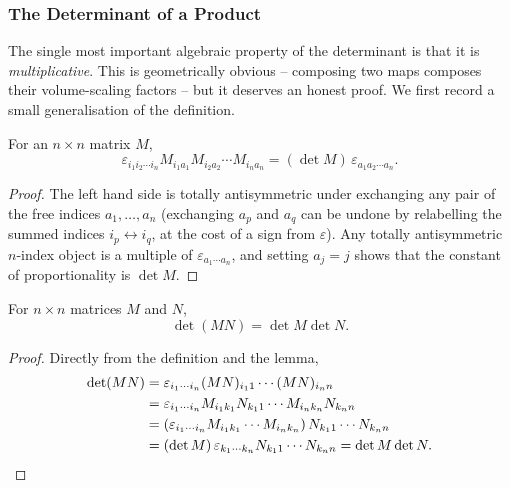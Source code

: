 \subsubsection{The Determinant of a Product}

The single most important algebraic property of the determinant is that it is \emph{multiplicative}. This is geometrically obvious -- composing two maps composes their volume-scaling factors -- but it deserves an honest proof. We first record a small generalisation of the definition.

\begin{lemma}\label{lemma:epsdet}
	For an $n \times n$ matrix $M$,
	$$
	\varepsilon_{i_1 i_2 \cdots i_n}M_{i_1 a_1}M_{i_2 a_2} \cdots M_{i_n a_n} = (\det M) \, \varepsilon_{a_1 a_2 \cdots a_n}.
	$$
\end{lemma}
\begin{proof}
	The left hand side is totally antisymmetric under exchanging any pair of the free indices $a_1, \dots, a_n$ (exchanging $a_p$ and $a_q$ can be undone by relabelling the summed indices $i_p \leftrightarrow i_q$, at the cost of a sign from $\varepsilon$). Any totally antisymmetric $n$-index object is a multiple of $\varepsilon_{a_1 \cdots a_n}$, and setting $a_j = j$ shows that the constant of proportionality is $\det M$.
\end{proof}

\begin{theorem}
	For $n \times n$ matrices $M$ and $N$,
	$$
	\det (MN) = \det M \det N.
	$$
\end{theorem}
\begin{proof}
	Directly from the definition and the lemma,
	\begin{align*}
		\det(MN) &= \varepsilon_{i_1 \cdots i_n}(MN)_{i_1 1} \cdots (MN)_{i_n n} \\
		&= \varepsilon_{i_1 \cdots i_n} M_{i_1 k_1} N_{k_1 1} \cdots M_{i_n k_n} N_{k_n n} \\
		&= \left(\varepsilon_{i_1 \cdots i_n} M_{i_1 k_1} \cdots M_{i_n k_n}\right) N_{k_1 1} \cdots N_{k_n n} \\
		&= (\det M) \, \varepsilon_{k_1 \cdots k_n} N_{k_1 1} \cdots N_{k_n n} = \det M \det N. \qedhere
	\end{align*}
\end{proof}


